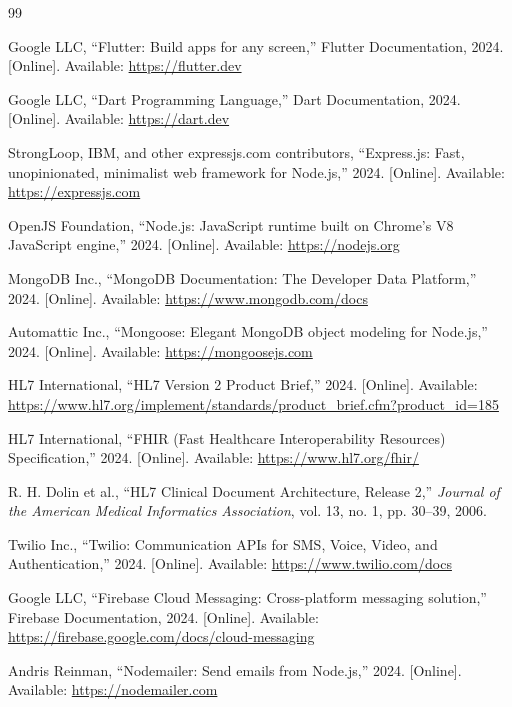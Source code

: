\documentclass[12pt, a4paper]{report}
\begin{document}
\newpage
\renewcommand{\bibname}{References}
\begin{thebibliography}{99}

Google LLC, ``Flutter: Build apps for any screen,'' Flutter Documentation, 2024. [Online]. Available: \url{https://flutter.dev}

Google LLC, ``Dart Programming Language,'' Dart Documentation, 2024. [Online]. Available: \url{https://dart.dev}

StrongLoop, IBM, and other expressjs.com contributors, ``Express.js: Fast, unopinionated, minimalist web framework for Node.js,'' 2024. [Online]. Available: \url{https://expressjs.com}

OpenJS Foundation, ``Node.js: JavaScript runtime built on Chrome's V8 JavaScript engine,'' 2024. [Online]. Available: \url{https://nodejs.org}

MongoDB Inc., ``MongoDB Documentation: The Developer Data Platform,'' 2024. [Online]. Available: \url{https://www.mongodb.com/docs}

Automattic Inc., ``Mongoose: Elegant MongoDB object modeling for Node.js,'' 2024. [Online]. Available: \url{https://mongoosejs.com}

HL7 International, ``HL7 Version 2 Product Brief,'' 2024. [Online]. Available: \url{https://www.hl7.org/implement/standards/product_brief.cfm?product_id=185}

HL7 International, ``FHIR (Fast Healthcare Interoperability Resources) Specification,'' 2024. [Online]. Available: \url{https://www.hl7.org/fhir/}

R. H. Dolin et al., ``HL7 Clinical Document Architecture, Release 2,'' \textit{Journal of the American Medical Informatics Association}, vol. 13, no. 1, pp. 30--39, 2006.

Twilio Inc., ``Twilio: Communication APIs for SMS, Voice, Video, and Authentication,'' 2024. [Online]. Available: \url{https://www.twilio.com/docs}

Google LLC, ``Firebase Cloud Messaging: Cross-platform messaging solution,'' Firebase Documentation, 2024. [Online]. Available: \url{https://firebase.google.com/docs/cloud-messaging}

Andris Reinman, ``Nodemailer: Send emails from Node.js,'' 2024. [Online]. Available: \url{https://nodemailer.com}


\end{thebibliography}
\end{document}
